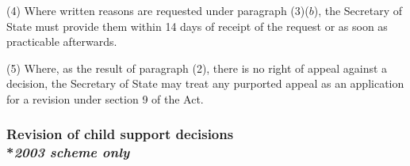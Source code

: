 \documentclass[12pt,a4paper]{article}
\begin{document}
(4) Where written reasons are requested under paragraph (3)($b$), the Secretary of State must provide them within 14 days of receipt of the request or as soon as practicable afterwards.

(5) Where, as the result of paragraph (2), there is no right of appeal against a decision, the Secretary of State may treat any purported appeal as an application for a revision under section 9 of the Act.


\subsubsection[3A. Revision of child support decisions]{Revision of child support decisions\\*\emph{2003 scheme only}}
\end{document}
